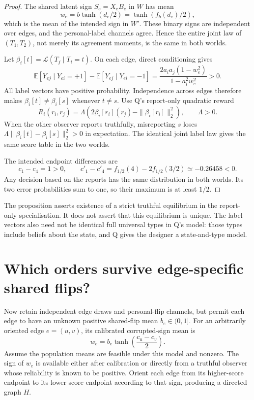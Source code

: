 \documentclass{article}
\begin{document}
\begin{proof}
The shared latent sign \(S_e=X_eB_e\) in \(W\) has mean
\[
w_e=b\tanh(d_e/2)=\tanh(f_b(d_e)/2),
\]
which is the mean of the intended sign in \(W'\). These binary signs are independent over edges, and the
personal-label channels agree. Hence the entire joint law of \((T_1,T_2)\), not merely its agreement
moments, is the same in both worlds. %

Let \(\beta_i[t]=\mathcal L(T_j\mid T_i=t)\). On each edge, direct conditioning gives
\[
\mathbb E[Y_{ej}\mid Y_{ei}=+1]
-\mathbb E[Y_{ej}\mid Y_{ei}=-1]
=\frac{2a_i a_j(1-w_e^2)}{1-a_i^2w_e^2}>0.
\]
All label vectors have positive probability. Independence across edges therefore makes
\(\beta_i[t]\ne\beta_i[s]\) whenever \(t\ne s\). Use Q's report-only quadratic reward
\[
R_i(r_i,r_j)=\Lambda\left(2\beta_i[r_i](r_j)
-\|\beta_i[r_i]\|_2^2\right),\qquad \Lambda>0.
\]
When the other observer reports truthfully, misreporting \(s\) loses
\(\Lambda\|\beta_i[t]-\beta_i[s]\|_2^2>0\) in expectation. The identical joint label law gives the same
score table in the two worlds. %

The intended endpoint differences are
\[
c_1-c_4=1>0,
\qquad
c'_1-c'_4=f_{1/2}(4)-2f_{1/2}(3/2)\simeq-0.26458<0.
\]
Any decision based on the reports has the same distribution in both worlds. Its two error probabilities
sum to one, so their maximum is at least \(1/2\). %
\end{proof}

The proposition asserts existence of a strict truthful equilibrium in the report-only specialisation. It
does not assert that this equilibrium is unique. The label vectors also need not be identical full
universal types in Q's model: those types include beliefs about the state, and Q gives the designer a
state-and-type model. %

\section{Which orders survive edge-specific shared flips?}

Now retain independent edge draws and personal-flip channels, but permit each edge to have an unknown
positive shared-flip mean \(b_e\in(0,1]\). For an arbitrarily oriented edge \(e=(u,v)\), its calibrated
corrupted-sign mean is
\[
w_e=b_e\tanh\!\left(\frac{c_u-c_v}{2}\right).
\]
Assume the population means are feasible under this model and nonzero. The sign of \(w_e\) is available
either after calibration or directly from a truthful observer whose reliability is known to be positive.
Orient each edge from its higher-score endpoint to its lower-score endpoint according to that sign,
producing a directed graph \(H\). %
\end{document}
